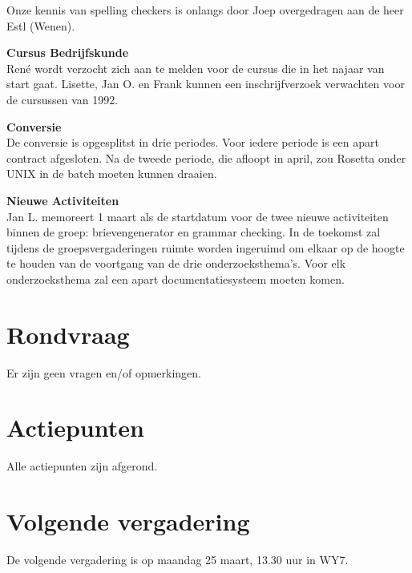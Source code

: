 \begin{description}
Onze  kennis van 
spelling checkers is 
onlangs door Joep overgedragen aan de heer Estl (Wenen). 

\item {\bf Cursus Bedrijfskunde}\\
Ren\'{e} wordt verzocht zich aan te melden voor de cursus die in het najaar van 
start gaat. Lisette, Jan O. en Frank kunnen een inschrijfverzoek 
verwachten voor de cursussen van 1992.

\item
{\bf Conversie}\\
De conversie is opgesplitst in drie periodes. Voor iedere periode is een apart 
contract afgesloten. Na de tweede periode, die afloopt in april, zou Rosetta 
onder UNIX in de batch moeten kunnen draaien.

\item
{\bf Nieuwe Activiteiten}\\
Jan L. memoreert 1 maart als de startdatum voor
de twee nieuwe activiteiten binnen de groep: brievengenerator en 
grammar checking. 
 In de toekomst zal tijdens de
groepsvergaderingen ruimte worden ingeruimd om elkaar op de hoogte te houden 
van de voortgang van de drie onderzoeksthema's.
Voor elk onderzoeksthema zal een apart documentatiesysteem 
moeten komen.  
\end{description}

\section{Rondvraag}
Er zijn geen vragen en/of opmerkingen.

\section{Actiepunten}

Alle actiepunten zijn afgerond.

\section{Volgende vergadering}
De volgende vergadering is op maandag 25 maart, 13.30 uur in WY7.\\



